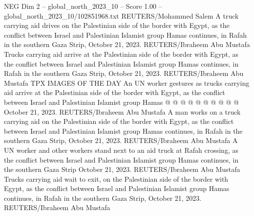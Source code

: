 \begin{textsample}{NEG Dim 2 – global\_north\_2023\_10 – Score 1.00 – global\_north\_2023\_10/102851968.txt}
REUTERS/Mohammed Salem A truck carrying aid drives on the Palestinian side of the border with Egypt, as the conflict between Israel and Palestinian Islamist group Hamas continues, in Rafah in the southern Gaza Strip, October 21, 2023.
REUTERS/Ibraheem Abu Mustafa Trucks carrying aid arrive at the Palestinian side of the border with Egypt, as the conflict between Israel and Palestinian Islamist group Hamas continues, in Rafah in the southern Gaza Strip, October 21, 2023.
REUTERS/Ibraheem Abu Mustafa TPX IMAGES OF THE DAY An UN worker gestures as trucks carrying aid arrive at the Palestinian side of the border with Egypt, as the conflict between Israel and Palestinian Islamist group Hamas @ @ @ @ @ @ @ @ @ @ October 21, 2023.
REUTERS/Ibraheem Abu Mustafa A man works on a truck carrying aid on the Palestinian side of the border with Egypt, as the conflict between Israel and Palestinian Islamist group Hamas continues, in Rafah in the southern Gaza Strip, October 21, 2023.
REUTERS/Ibraheem Abu Mustafa A UN worker and other workers stand next to an aid truck at Rafah crossing, as the conflict between Israel and Palestinian Islamist group Hamas continues, in the southern Gaza Strip October 21, 2023.
REUTERS/Ibraheem Abu Mustafa Trucks carrying aid wait to exit, on the Palestinian side of the border with Egypt, as the conflict between Israel and Palestinian Islamist group Hamas continues, in Rafah in the southern Gaza Strip, October 21, 2023.
REUTERS/Ibraheem Abu Mustafa

\end{textsample}
